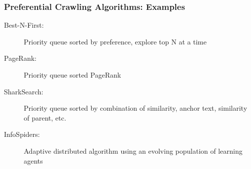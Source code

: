 \documentclass{beamer}
\begin{document}
\begin{frame} \frametitle{Preferential Crawling Algorithms: Examples}

\begin{description}
\item [Best-N-First: ] Priority queue sorted by preference, explore top N at a time %
\item [PageRank:] Priority queue sorted PageRank
\item [SharkSearch:] Priority queue sorted by combination of
  similarity, anchor text, similarity of parent, etc. %
\item[InfoSpiders:] Adaptive distributed algorithm using an evolving  population of learning agents
\end{description}
\end{frame}
\end{document}
